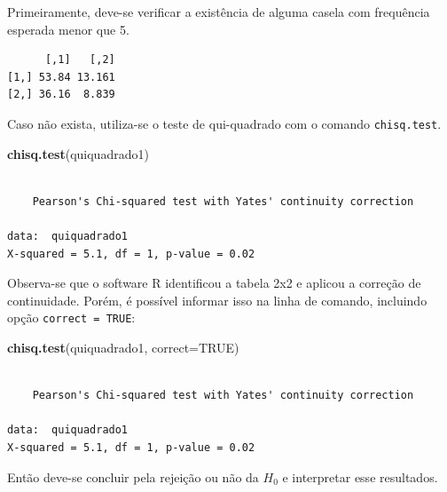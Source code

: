 \documentclass[12pt,brazil,oneside]{book}
\newenvironment{Shaded}{\begin{snugshade}}{\end{snugshade}}
\newcommand{\DataTypeTok}[1]{\textcolor[rgb]{0.13,0.29,0.53}{#1}}
\newcommand{\KeywordTok}[1]{\textcolor[rgb]{0.13,0.29,0.53}{\textbf{#1}}}
\newcommand{\NormalTok}[1]{#1}
\newcommand{\OperatorTok}[1]{\textcolor[rgb]{0.81,0.36,0.00}{\textbf{#1}}}
\newcommand{\OtherTok}[1]{\textcolor[rgb]{0.56,0.35,0.01}{#1}}
\begin{document}
Primeiramente, deve-se verificar a existência de alguma casela com frequência esperada menor que 5.

\begin{Shaded}
\end{Shaded}

\begin{verbatim}
      [,1]   [,2]
[1,] 53.84 13.161
[2,] 36.16  8.839
\end{verbatim}

Caso não exista, utiliza-se o teste de qui-quadrado com o comando \texttt{chisq.test}.

\begin{Shaded}
\begin{Highlighting}[]
\KeywordTok{chisq.test}\NormalTok{(quiquadrado1)}
\end{Highlighting}
\end{Shaded}

\begin{verbatim}

    Pearson's Chi-squared test with Yates' continuity correction

data:  quiquadrado1
X-squared = 5.1, df = 1, p-value = 0.02
\end{verbatim}

Observa-se que o software R identificou a tabela 2x2 e aplicou a correção de continuidade. Porém, é possível informar isso na linha de comando, incluindo opção \texttt{correct\ =\ TRUE}:

\begin{Shaded}
\begin{Highlighting}[]
\KeywordTok{chisq.test}\NormalTok{(quiquadrado1, }\DataTypeTok{correct=}\OtherTok{TRUE}\NormalTok{)}
\end{Highlighting}
\end{Shaded}

\begin{verbatim}

    Pearson's Chi-squared test with Yates' continuity correction

data:  quiquadrado1
X-squared = 5.1, df = 1, p-value = 0.02
\end{verbatim}

Então deve-se concluir pela rejeição ou não da \(H_0\) e interpretar esse resultados.
\end{document}
